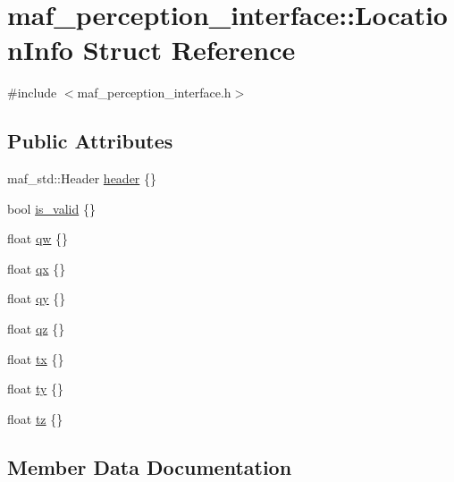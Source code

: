 \hypertarget{structmaf__perception__interface_1_1LocationInfo}{}\section{maf\+\_\+perception\+\_\+interface\+:\+:Location\+Info Struct Reference}
\label{structmaf__perception__interface_1_1LocationInfo}


{\ttfamily \#include $<$maf\+\_\+perception\+\_\+interface.\+h$>$}

\subsection*{Public Attributes}
\begin{DoxyCompactItemize}
\item 
maf\+\_\+std\+::\+Header \hyperlink{structmaf__perception__interface_1_1LocationInfo_aae8258bd7b3f6bd8b5061d90aef23846}{header} \{\}
\item 
bool \hyperlink{structmaf__perception__interface_1_1LocationInfo_a4e0ee8e7a770a9a645ea4d28c3d81dd0}{is\+\_\+valid} \{\}
\item 
float \hyperlink{structmaf__perception__interface_1_1LocationInfo_a025b9ce99190dd64f6f3097bee187581}{qw} \{\}
\item 
float \hyperlink{structmaf__perception__interface_1_1LocationInfo_a1923e4be4dbb267db7ce02d620efaa8f}{qx} \{\}
\item 
float \hyperlink{structmaf__perception__interface_1_1LocationInfo_aa4da39867bf2792da261035c8874c3c8}{qy} \{\}
\item 
float \hyperlink{structmaf__perception__interface_1_1LocationInfo_a08c78cc811a9768402e5f7816fc951a9}{qz} \{\}
\item 
float \hyperlink{structmaf__perception__interface_1_1LocationInfo_a501deae5259c068abc2cf324efa46ecb}{tx} \{\}
\item 
float \hyperlink{structmaf__perception__interface_1_1LocationInfo_a8d22e741dc1e3242a80338133da36278}{ty} \{\}
\item 
float \hyperlink{structmaf__perception__interface_1_1LocationInfo_ae5e011e94bead05c1f918548aca537d9}{tz} \{\}
\end{DoxyCompactItemize}


\subsection{Member Data Documentation}
\mbox{\label{structmaf__perception__interface_1_1LocationInfo_aae8258bd7b3f6bd8b5061d90aef23846}} 

